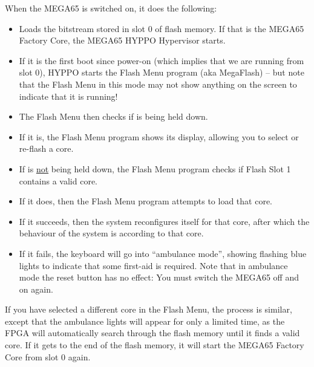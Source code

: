 When the MEGA65 is switched on, it does the following:
\begin{itemize}
\item Loads the bitstream stored in slot 0 of flash memory. If that is the MEGA65 Factory Core, the MEGA65 
  HYPPO Hypervisor starts.
\item If it is the first boot since power-on (which implies that we are running from slot 0), HYPPO starts the Flash Menu program (aka MegaFlash) -- but note that the Flash Menu in
      this mode may not show anything on the screen to indicate that it is running!
\item The Flash Menu then checks if  is being held down.
\item If it is, the Flash Menu program shows its display, allowing you to select or re-flash a core.
\item If  is \underline{not} being held down, the Flash Menu program checks if Flash Slot 1 contains a valid
      core.
\item If it does, then the Flash Menu program attempts to load that core.
\item If it succeeds, then the system reconfigures itself for that core, after which the behaviour of the system is
      according to that core.
\item If it fails, the keyboard will go into ``ambulance mode'', showing flashing blue lights to indicate that some
      first-aid is required. Note that in ambulance mode the reset button has no effect: You must switch the
      MEGA65 off and on again.
\end{itemize}



If you have selected a different core in the Flash Menu, the process
is similar, except that the ambulance lights will appear for only a
limited time, as the FPGA will automatically search through the flash
memory until it finds a valid core. If it gets to the end of the flash
memory, it will start the MEGA65 Factory Core from slot 0 again.




